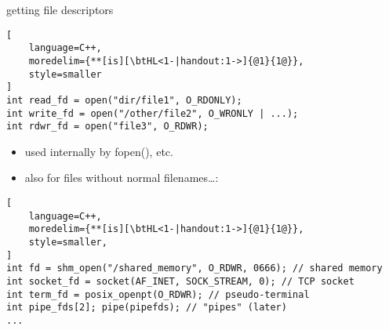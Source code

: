 
\begin{frame}[fragile,label=gettingFds]{getting file descriptors}
\begin{lstlisting}[
    language=C++,
    moredelim={**[is][\btHL<1-|handout:1->]{@1}{1@}},
    style=smaller
]
int read_fd = open("dir/file1", O_RDONLY);
int write_fd = open("/other/file2", O_WRONLY | ...);
int rdwr_fd = open("file3", O_RDWR);
\end{lstlisting}
\begin{itemize}
\item used internally by fopen(), etc.
\item also for files without normal filenames\ldots:
\end{itemize}
\begin{lstlisting}[
    language=C++,
    moredelim={**[is][\btHL<1-|handout:1->]{@1}{1@}},
    style=smaller,
]
int fd = shm_open("/shared_memory", O_RDWR, 0666); // shared memory
int socket_fd = socket(AF_INET, SOCK_STREAM, 0); // TCP socket
int term_fd = posix_openpt(O_RDWR); // pseudo-terminal
int pipe_fds[2]; pipe(pipefds); // "pipes" (later)
...
\end{lstlisting}
\end{frame}
